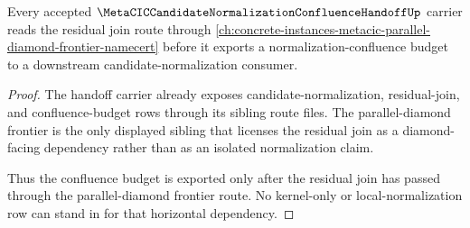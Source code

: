 \begin{theorem}
\label{thm:metacic-candidate-normalization-confluence-handoff-parallel-diamond-frontier-dependency-bridge}
Every accepted $\MetaCICCandidateNormalizationConfluenceHandoffUp$ carrier reads the residual join route through \autoref{ch:concrete-instances-metacic-parallel-diamond-frontier-namecert} before it exports a normalization-confluence budget to a downstream candidate-normalization consumer.
\end{theorem}
\begin{proof}
The handoff carrier already exposes candidate-normalization, residual-join, and confluence-budget rows through its sibling route files. The parallel-diamond frontier is the only displayed sibling that licenses the residual join as a diamond-facing dependency rather than as an isolated normalization claim.

Thus the confluence budget is exported only after the residual join has passed through the parallel-diamond frontier route. No kernel-only or local-normalization row can stand in for that horizontal dependency.
\end{proof}
